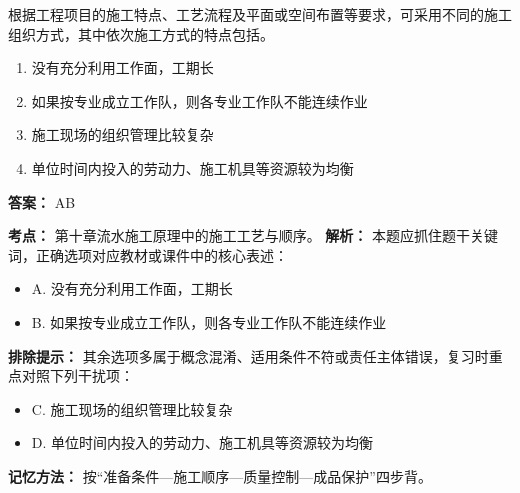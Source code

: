 \documentclass[UTF8,fontset=fandol,11pt]{ctexart}
\begin{document}
\begin{quizbox}[title={第 16 题}]
根据工程项目的施工特点、工艺流程及平面或空间布置等要求，可采用不同的施工组织方式，其中依次施工方式的特点包括。\\
\begin{enumerate}[label=\Alph*.]
\item 没有充分利用工作面，工期长
\item 如果按专业成立工作队，则各专业工作队不能连续作业
\item 施工现场的组织管理比较复杂
\item 单位时间内投入的劳动力、施工机具等资源较为均衡
\end{enumerate}
\textbf{答案：} AB
\vspace{0.25em}
\begin{answerbox}[title={考点解析}]
\textbf{考点：} 第十章流水施工原理中的施工工艺与顺序。
\textbf{解析：} 本题应抓住题干关键词，正确选项对应教材或课件中的核心表述：
\begin{itemize}
\item A. 没有充分利用工作面，工期长
\item B. 如果按专业成立工作队，则各专业工作队不能连续作业
\end{itemize}
\textbf{排除提示：} 其余选项多属于概念混淆、适用条件不符或责任主体错误，复习时重点对照下列干扰项：
\begin{itemize}
\item C. 施工现场的组织管理比较复杂
\item D. 单位时间内投入的劳动力、施工机具等资源较为均衡
\end{itemize}
\textbf{记忆方法：} 按“准备条件—施工顺序—质量控制—成品保护”四步背。
\end{answerbox}
\end{quizbox}
\end{document}

